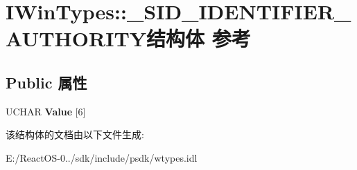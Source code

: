 \hypertarget{struct_i_win_types_1_1___s_i_d___i_d_e_n_t_i_f_i_e_r___a_u_t_h_o_r_i_t_y}{}\section{I\+Win\+Types\+:\+:\+\_\+\+S\+I\+D\+\_\+\+I\+D\+E\+N\+T\+I\+F\+I\+E\+R\+\_\+\+A\+U\+T\+H\+O\+R\+I\+T\+Y结构体 参考}
\label{struct_i_win_types_1_1___s_i_d___i_d_e_n_t_i_f_i_e_r___a_u_t_h_o_r_i_t_y}
\subsection*{Public 属性}
\begin{DoxyCompactItemize}
\item 
\mbox{\label{struct_i_win_types_1_1___s_i_d___i_d_e_n_t_i_f_i_e_r___a_u_t_h_o_r_i_t_y_a9aeedac7c87360f8074e2497720e3e37}} 
U\+C\+H\+AR {\bfseries Value} \mbox{[}6\mbox{]}
\end{DoxyCompactItemize}


该结构体的文档由以下文件生成\+:\begin{DoxyCompactItemize}
\item 
E\+:/\+React\+O\+S-\/0../sdk/include/psdk/wtypes.\+idl\end{DoxyCompactItemize}
